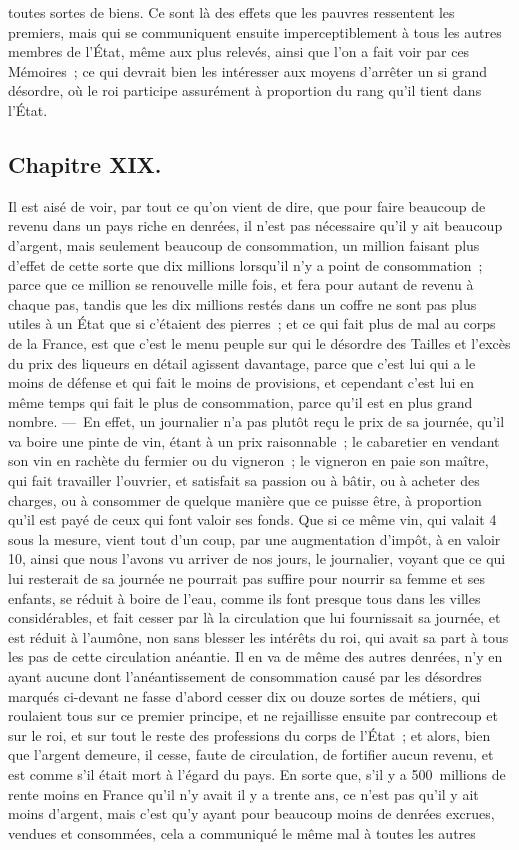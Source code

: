 \documentclass[french,twoside]{book} %
\begin{document}
toutes sortes de biens. Ce sont là des effets que les pauvres ressentent les premiers, mais qui se communiquent ensuite imperceptiblement à tous les autres membres de l’État, même aux plus relevés, ainsi que l’on a fait voir par ces Mémoires ; ce qui devrait bien les intéresser aux moyens d’arrêter un si grand désordre, où le roi participe assurément à proportion du rang qu’il tient dans l’État.
\subsection[{Chapitre XIX.}]{Chapitre XIX.}
\noindent Il est aisé de voir, par tout ce qu’on vient de dire, que pour faire beaucoup de revenu dans un pays riche en denrées, il n’est pas nécessaire qu’il y ait beaucoup d’argent, mais seulement beaucoup de consommation, un million faisant plus d’effet de cette sorte que dix millions lorsqu’il n’y a point de consommation ; parce que ce million se renouvelle mille fois, et fera pour autant de revenu à chaque pas, tandis que les dix millions restés dans un coffre ne sont pas plus utiles à un État que si c’étaient des pierres ; et ce qui fait plus de mal au corps de la France, est que c’est le menu peuple sur qui le désordre des Tailles et l’excès du prix des liqueurs en détail agissent davantage, parce que c’est lui qui a le moins de défense et qui fait le moins de provisions, et cependant c’est lui en même temps qui fait le plus de consommation, parce qu’il est en plus grand nombre. — En effet, un journalier n’a pas plutôt reçu le prix de sa journée, qu’il va boire une pinte de vin, étant à un prix raisonnable ; le cabaretier en vendant son vin en rachète du fermier ou du vigneron ; le vigneron en paie son maître, qui fait travailler l’ouvrier, et satisfait sa passion ou à bâtir, ou à acheter des charges, ou à consommer de quelque manière que ce puisse être, à proportion qu’il est payé de ceux qui font valoir ses fonds. Que si ce même vin, qui valait 4 sous la mesure, vient tout d’un coup, par une augmentation d’impôt, à en valoir 10, ainsi que nous l’avons vu arriver de nos jours, le journalier, voyant que ce qui lui resterait de sa journée ne pourrait pas suffire pour nourrir sa femme et ses enfants, se réduit à boire de l’eau, comme ils font presque tous dans les villes considérables, et fait cesser par là la circulation que lui fournissait sa journée, et est réduit à l’aumône, non sans blesser les intérêts du roi, qui avait sa part à tous les pas de cette circulation anéantie. Il en va de même des autres denrées, n’y en ayant aucune dont l’anéantissement de consommation causé par les désordres marqués ci-devant ne fasse d’abord cesser dix ou douze sortes de métiers, qui roulaient tous sur ce premier principe, et ne rejaillisse ensuite par contrecoup et sur le roi, et sur tout le reste des professions du corps de l’État ; et alors, bien que l’argent demeure, il cesse, faute de circulation, de fortifier aucun revenu, et est comme s’il était mort à l’égard du pays. En sorte que, s’il y a 500 millions de rente moins en France qu’il n’y avait il y a trente ans, ce n’est pas qu’il y ait moins d’argent, mais c’est qu’y ayant pour beaucoup moins de denrées excrues, vendues et consommées, cela a communiqué le même mal à toutes les autres 
\end{document}
